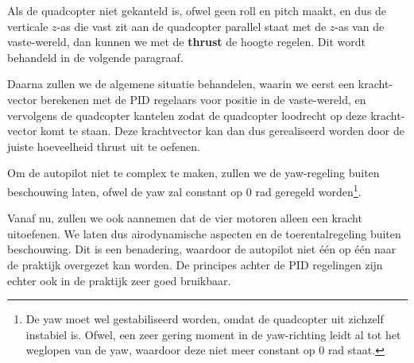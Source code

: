 \documentclass[a4paper,11pt]{article}
\begin{document}
Als de quadcopter niet gekanteld is, ofwel geen roll en pitch maakt, en dus de verticale $z$-as die vast zit aan de quadcopter parallel staat
met de $z$-as van de vaste-wereld, dan kunnen we met de \textbf{thrust}
de hoogte regelen. Dit wordt behandeld in de volgende paragraaf.

 Daarna zullen we de algemene situatie behandelen, waarin we eerst
 een kracht-vector berekenen met de PID regelaars voor positie in de
 vaste-wereld, en vervolgens de quadcopter kantelen zodat de quadcopter
 loodrecht op deze kracht-vector komt te staan. Deze krachtvector kan dan dus gerealiseerd worden door de juiste hoeveelheid thrust uit te oefenen.

Om de autopilot niet te complex te maken, zullen we de yaw-regeling  buiten beschouwing laten, ofwel de yaw zal constant op 0 rad geregeld worden\footnote{De yaw moet wel gestabiliseerd worden, omdat de quadcopter uit zichzelf instabiel is. Ofwel, een zeer gering moment in de yaw-richting leidt al tot het weglopen van de yaw, waardoor deze niet meer constant op 0 rad staat.}.

Vanaf nu, zullen we ook aannemen dat de vier motoren alleen een kracht uitoefenen. We laten dus airodynamische aspecten en de toerentalregeling buiten beschouwing. Dit is een benadering, waardoor de autopilot niet \'e\'en op \'e\'en naar de praktijk overgezet kan worden. De principes achter de PID regelingen zijn echter ook in de praktijk zeer goed bruikbaar.
\end{document}
